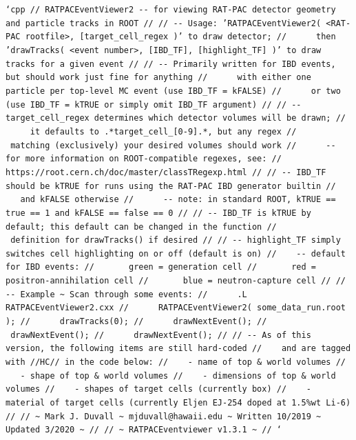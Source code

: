 \documentclass[a4paper]{article}
\begin{document}
\texttt{`cpp
// RATPACEventViewer2 -{}- for viewing RAT-PAC detector geometry and particle tracks in ROOT
//
// -{}- Usage: 'RATPACEventViewer2( <RAT-PAC rootfile>, {[}\textquotedbl{}target\_cell\_regex\textquotedbl{}{]} )' to draw detector;
// ~ ~ ~then 'drawTracks( <event number>, {[}IBD\_TF{]}, {[}highlight\_TF{]} )' to draw tracks for a given event
//
// -{}- Primarily written for IBD events, but should work just fine for anything
// ~ ~ ~with either one particle per top-level MC event (use IBD\_TF = kFALSE)
// ~ ~ ~or two (use IBD\_TF = kTRUE or simply omit IBD\_TF argument)
//
// -{}- \textquotedbl{}target\_cell\_regex\textquotedbl{} determines which detector volumes will be drawn;
// ~ ~ ~it defaults to \textquotedbl{}.*target\_cell\_{[}0-9{]}.*\textquotedbl{}, but any regex
// ~ ~ ~matching (exclusively) your desired volumes should work
// ~ ~ ~-{}- for more information on ROOT-compatible regexes, see:
// ~ ~ ~ ~ https://root.cern.ch/doc/master/classTRegexp.html
//
// -{}- \textquotedbl{}IBD\_TF\textquotedbl{} should be kTRUE for runs using the RAT-PAC IBD generator builtin
// ~ ~ ~and kFALSE otherwise
// ~ ~ ~-{}- note: in standard ROOT, kTRUE == true == 1 and kFALSE == false == 0
//
// -{}- \textquotedbl{}IBD\_TF\textquotedbl{} is kTRUE by default; this default can be changed in the function
// ~ ~ ~definition for \textquotedbl{}drawTracks()\textquotedbl{} if desired
//
// -{}- \textquotedbl{}highlight\_TF\textquotedbl{} simply switches cell highlighting on or off (default is on)
// ~ ~-{}- default for IBD events:
// ~ ~ ~ green = generation cell
// ~ ~ ~ red = positron-annihilation cell
// ~ ~ ~ blue = neutron-capture cell
//
// -{}- Example \textasciitilde{} Scan through some events:
// ~ ~ ~.L RATPACEventViewer2.cxx
// ~ ~ ~RATPACEventViewer2( \textquotedbl{}some\_data\_run.root\textquotedbl{} );
// ~ ~ ~drawTracks(0);
// ~ ~ ~drawNextEvent();
// ~ ~ ~drawNextEvent();
// ~ ~ ~drawNextEvent();
//
// -{}- As of this version, the following items are still hard-coded
// ~ ~and are tagged with //HC// in the code below:
// ~ ~- name of top \& world volumes
// ~ ~- shape of top \& world volumes
// ~ ~- dimensions of top \& world volumes
// ~ ~- shapes of target cells (currently \textquotedbl{}box\textquotedbl{})
// ~ ~- material of target cells (currently Eljen EJ-254 doped at 1.5\%wt Li-6)
//
// \textasciitilde{} Mark J. Duvall \textasciitilde{} mjduvall@hawaii.edu \textasciitilde{} Written 10/2019 \textasciitilde{} Updated 3/2020 \textasciitilde{} //
// \textasciitilde{} RATPACEventviewer v1.3.1 \textasciitilde{} //
`}
\end{document}
